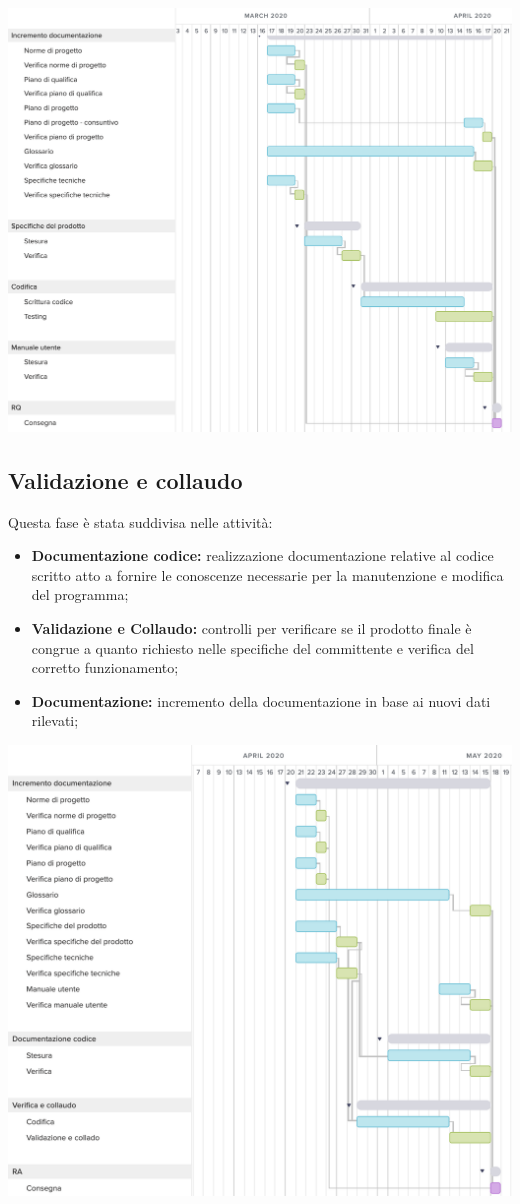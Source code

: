 \includegraphics[width=\textwidth]{res/img/g4}

\subsection{Validazione e collaudo}
Questa fase è stata suddivisa nelle attività:
\begin{itemize}
	\item \textbf{Documentazione codice:} realizzazione documentazione relative al codice scritto atto a fornire le conoscenze necessarie per la manutenzione e modifica del programma;
	\item \textbf{Validazione e Collaudo:} controlli per verificare se il prodotto finale è congrue a quanto richiesto nelle specifiche del committente e verifica del corretto funzionamento;
	\item \textbf{Documentazione:} incremento della documentazione in base ai nuovi dati rilevati;
\end{itemize}
\includegraphics[width=\textwidth]{res/img/g5}